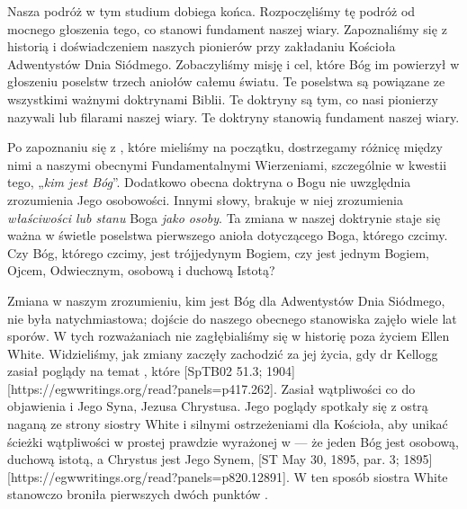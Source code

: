 
Nasza podróż w tym studium dobiega końca. Rozpoczęliśmy tę podróż od mocnego głoszenia tego, co stanowi fundament naszej wiary. Zapoznaliśmy się z historią i doświadczeniem naszych pionierów przy zakładaniu Kościoła Adwentystów Dnia Siódmego. Zobaczyliśmy misję i cel, które Bóg im powierzył w głoszeniu poselstw trzech aniołów całemu światu. Te poselstwa są powiązane ze wszystkimi ważnymi doktrynami Biblii. Te doktryny są tym, co nasi pionierzy nazywali  lub filarami naszej wiary. Te doktryny stanowią fundament naszej wiary.

Po zapoznaniu się z , które mieliśmy na początku, dostrzegamy różnicę między nimi a naszymi obecnymi Fundamentalnymi Wierzeniami, szczególnie w kwestii tego, „\textit{kim jest Bóg}”. Dodatkowo obecna doktryna o Bogu nie uwzględnia zrozumienia Jego osobowości. Innymi słowy, brakuje w niej zrozumienia \textit{właściwości lub stanu} Boga \textit{jako osoby}. Ta zmiana w naszej doktrynie staje się ważna w świetle poselstwa pierwszego anioła dotyczącego Boga, którego czcimy. Czy Bóg, którego czcimy, jest trójjedynym Bogiem, czy jest jednym Bogiem, Ojcem, Odwiecznym, osobową i duchową Istotą?

Zmiana w naszym zrozumieniu, kim jest Bóg dla Adwentystów Dnia Siódmego, nie była natychmiastowa; dojście do naszego obecnego stanowiska zajęło wiele lat sporów. W tych rozważaniach nie zagłębialiśmy się w historię poza życiem Ellen White. Widzieliśmy, jak zmiany zaczęły zachodzić za jej życia, gdy dr Kellogg zasiał poglądy na temat , które [SpTB02 51.3; 1904][https://egwwritings.org/read?panels=p417.262]. Zasiał wątpliwości co do objawienia  i Jego Syna, Jezusa Chrystusa. Jego poglądy spotkały się z ostrą naganą ze strony siostry White i silnymi ostrzeżeniami dla Kościoła, aby unikać ścieżki wątpliwości w prostej prawdzie wyrażonej w  — że jeden Bóg jest osobową, duchową istotą, a Chrystus jest Jego Synem, [ST May 30, 1895, par. 3; 1895][https://egwwritings.org/read?panels=p820.12891]. W ten sposób siostra White stanowczo broniła pierwszych dwóch punktów .

